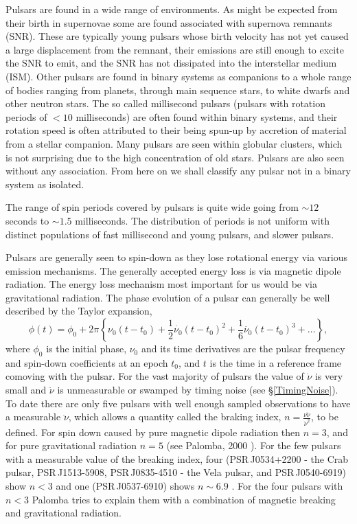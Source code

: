 Pulsars are found in a wide range of environments. As might be expected from their birth in
supernovae some are found associated with supernova remnants (SNR). These are typically young
pulsars whose birth velocity has not yet caused a large displacement from the remnant, their
emissions are still enough to excite the SNR to emit, and the SNR has not dissipated into the
interstellar medium (ISM). Other pulsars are found in binary systems as companions to a whole range
of bodies ranging from planets, through main sequence stars, to white dwarfs and other neutron
stars. The so called millisecond pulsars (pulsars with rotation periods of $< 10$ milliseconds) are
often found within binary systems, and their rotation speed is often attributed to their being
spun-up by accretion of material from a stellar companion. Many pulsars are seen within globular
clusters, which is not surprising due to the high concentration of old stars. Pulsars are also seen
without any association. From here on we shall classify any pulsar not in a binary system as
isolated. 

The range of spin periods covered by pulsars is quite wide going from $\sim 12$ seconds to
$\sim 1.5$ milliseconds. The distribution of periods is not uniform with distinct populations of
fast millisecond and young pulsars, and slower pulsars. 

Pulsars are generally seen to spin-down as they lose rotational energy via various emission
mechanisms. The generally accepted energy loss is via magnetic dipole radiation. The energy loss
mechanism most important for us would be via gravitational radiation. The phase evolution of a
pulsar can generally be well described by the Taylor expansion,
\begin{equation}\label{PhaseTaylorExp}
\phi(t) = \phi_0 + 2\pi{}\left\{\nu_0(t-t_0) + \frac{1}{2}\dot{\nu_0}(t-t_0)^2 +
\frac{1}{6}\ddot{\nu_0}(t-t_0)^3 + \ldots\right\},
\end{equation}
where $\phi_0$ is the initial phase, $\nu_0$ and its time derivatives are the pulsar frequency and
spin-down coefficients at an epoch $t_0$, and $t$ is the time in a reference frame comoving with the
pulsar. For the vast majority of pulsars the value of $\dot{\nu}$ is very small and $\ddot{\nu}$ is
unmeasurable or swamped by timing noise (see \S\ref{TimingNoise}). To date there are only five
pulsars with well enough sampled observations to have a measurable $\ddot{\nu}$, which allows a
quantity called the braking index, $n = \frac{\nu\ddot{\nu}}{\dot{\nu}^2}$, to be defined. For spin
down caused by pure magnetic dipole radiation then $n=3$, and for pure gravitational radiation $n=5$
(see Palomba, 2000 \cite{Palomba:2000}). For the few pulsars with a measurable value of the breaking
index, four (PSR\,J0534+2200 - the Crab pulsar, PSR\,J1513-5908, PSR\,J0835-4510 - the Vela
pulsar, and PSR\,J0540-6919) show $n<3$ \cite{Palomba:2000} and one (PSR\,J0537-6910) shows $n \sim
6.9$ \cite{Marshall:2004}. For the four pulsars with $n<3$ Palomba \cite{Palomba:2000} tries to
explain them with a combination of magnetic breaking and gravitational radiation. 

